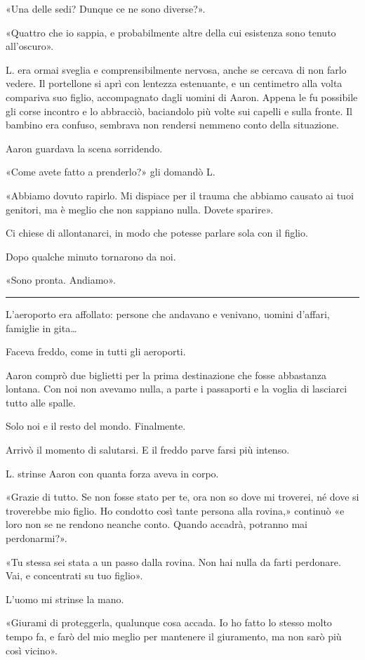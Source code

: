 \documentclass[a4paper,10pt]{memoir}
\begin{document}
«Una delle sedi? Dunque ce ne sono diverse?».

«Quattro che io sappia, e probabilmente altre della cui esistenza sono tenuto all'oscuro».

L. era ormai sveglia e comprensibilmente nervosa, anche se cercava di non farlo vedere. Il portellone si aprì con
lentezza estenuante, e un centimetro alla volta compariva suo figlio, accompagnato dagli uomini di Aaron. Appena le fu
possibile gli corse incontro e lo abbracciò, baciandolo più volte sui capelli e sulla fronte. Il bambino era confuso,
sembrava non rendersi nemmeno conto della situazione.

Aaron guardava la scena sorridendo.

«Come avete fatto a prenderlo?» gli domandò L.

«Abbiamo dovuto rapirlo. Mi dispiace per il trauma che abbiamo causato ai tuoi genitori, ma è meglio che non sappiano
nulla. Dovete sparire».

Ci chiese di allontanarci, in modo che potesse parlare sola con il figlio.

Dopo qualche minuto tornarono da noi.

«Sono pronta. Andiamo».

\plainbreak{1}

L'aeroporto era affollato: persone che andavano e venivano, uomini d'affari, famiglie in gita\dots{}

Faceva freddo, come in tutti gli aeroporti.

Aaron comprò due biglietti per la prima destinazione che fosse abbastanza lontana. Con noi non avevamo nulla, a parte i
passaporti e la voglia di lasciarci tutto alle spalle.

Solo noi e il resto del mondo. Finalmente.

Arrivò il momento di salutarsi. E il freddo parve farsi più intenso.

L. strinse Aaron con quanta forza aveva in corpo.

«Grazie di tutto. Se non fosse stato per te, ora non so dove mi troverei, né dove si troverebbe mio figlio. Ho condotto
così tante persona alla rovina,» continuò «e loro non se ne rendono neanche conto. Quando accadrà, potranno mai
perdonarmi?».

«Tu stessa sei stata a un passo dalla rovina. Non hai nulla da farti perdonare. Vai, e concentrati su tuo figlio».

L'uomo mi strinse la mano.

«Giurami di proteggerla, qualunque cosa accada. Io ho fatto lo stesso molto tempo fa, e farò del mio meglio per
mantenere il giuramento, ma non sarò più così vicino».
\end{document}
